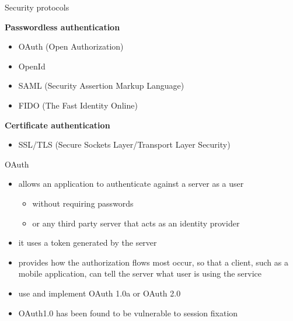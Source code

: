 \documentclass[pdf]{beamer}
\begin{document}
\begin{frame}{Security protocols}

\textbf{Passwordless authentication}

\begin{itemize}
\item
OAuth (Open Authorization)

\item
OpenId

\item
SAML (Security Assertion Markup Language)

\item
FIDO (The Fast Identity Online)

\end{itemize}

\textbf{Certificate authentication}

\begin{itemize}
\item
SSL/TLS (Secure Sockets Layer/Transport Layer Security)
\end{itemize}

\end{frame}



\begin{frame}{OAuth}
\begin{itemize}
\item
allows an application to authenticate against a server as a user
\begin{itemize}
\item
without requiring passwords
\item
or any third party server that acts as an identity provider
\end{itemize}

\item
it uses a token generated by the server

\item
provides how the authorization flows most occur, so that a client, such as a mobile application, can tell the server what user is using the service

\item
use and implement OAuth 1.0a or OAuth 2.0

\item
OAuth1.0 has been found to be vulnerable to session fixation
\end{itemize}
\end{frame}
\end{document}
